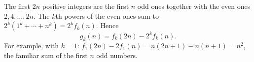 The first $2n$ positive integers are the first $n$ odd ones together with the even ones $2,4,\dots,2n$. The $k$th powers of the even ones sum to $2^k\left(1^k+\cdots+n^k\right)=2^kf_k(n)$. Hence
\[g_k(n)=\boxed{f_k(2n)-2^kf_k(n)}.\]
For example, with $k=1$: $f_1(2n)-2f_1(n)=n(2n+1)-n(n+1)=n^2$, the familiar sum of the first $n$ odd numbers.
